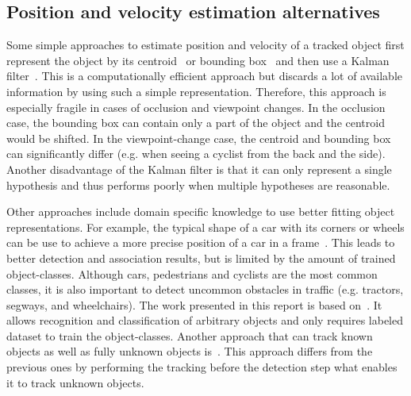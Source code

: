 \documentclass[twoside,a4paper,article]{combine}
\begin{document}
\subsection{Position and velocity estimation alternatives}
\label{sub:pos-vel-est-alt}
Some simple approaches to estimate position and velocity of a tracked
object first represent the object by its
centroid~\cite{kalman-centroid, towards-aut-cars} or bounding
box~\cite{kalman-bounding-box, kalman-bounding-box2,
  kalman-bounding-box3} and then use a Kalman
filter~\cite{ai-modern}. This is a computationally efficient approach
but discards a lot of available information by using such a simple
representation. Therefore, this approach is especially fragile in cases
of occlusion and viewpoint changes. In the occlusion case, the
bounding box can contain only a part of the object and the centroid
would be shifted. In the viewpoint-change case, the centroid and
bounding box can significantly differ (e.g. when seeing a cyclist from
the back and the side). Another disadvantage of the Kalman filter is
that it can only represent a single hypothesis and thus performs
poorly when multiple hypotheses are reasonable.

Other approaches include domain specific knowledge to use better
fitting object representations. For example, the typical shape of a car
with its corners or wheels can be use to achieve a more precise
position of a car in a frame~\cite{use-car-shape, use-car-shape2,
  use-car-shape3}. This leads to better detection and association
results, but is limited by the amount of trained
object-classes. Although cars, pedestrians and cyclists are the most
common classes, it is also important to detect uncommon obstacles in
traffic (e.g. tractors, segways, and wheelchairs). The work presented
in this report is based on~\cite{arbitrary-object-recognition}. It
allows recognition and classification of arbitrary objects and only
requires labeled dataset to train the object-classes. Another approach
that can track known objects as well as fully unknown objects
is~\cite{leibe-tracking-before-detection}. This approach differs from
the previous ones by performing the tracking before the detection
step what enables it to track unknown objects.
\end{document}

